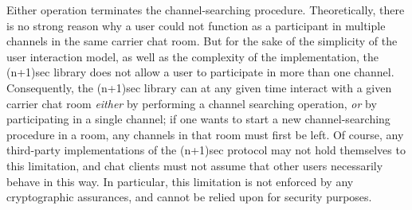 \documentclass{article}
\begin{document}
Either operation terminates the channel-searching procedure.
Theoretically, there is no strong reason why a user could not function as a participant in multiple channels in the same carrier chat room.
But for the sake of the simplicity of the user interaction model, as well as the complexity of the implementation, the (n+1)sec library does not allow a user to participate in more than one channel.
Consequently, the (n+1)sec library can at any given time interact with a given carrier chat room \emph{either} by performing a channel searching operation, \emph{or} by participating in a single channel; if one wants to start a new channel-searching procedure in a room, any channels in that room must first be left.
Of course, any third-party implementations of the (n+1)sec protocol may not hold themselves to this limitation, and chat clients must not assume that other users necessarily behave in this way.
In particular, this limitation is not enforced by any cryptographic assurances, and cannot be relied upon for security purposes.
\end{document}
